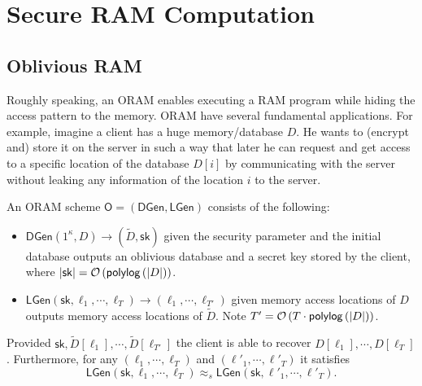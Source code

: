 
\newcommand{\eps}{\varepsilon}
\renewcommand{\inp}[1]{\left(#1\right)}
\newcommand{\inb}[1]{\left[#1\right]}
\newcommand{\inap}[1]{\left\langle #1\right\rangle}
\newcommand{\indi}[1]{\mathbbm{1}\inb{#1}}
\renewcommand{\abs}[1]{\left|#1\right|}
\renewcommand{\prob}[1]{\mathbb{P}\left[#1\right]}
\newcommand{\expec}[1]{\mathbb{E}\left[#1\right]}
\newcommand{\co}[1]{{\mathcal O}\left(#1\right)}
\newcommand{\tco}[1]{{\tilde{\mathcal O}}\left(#1\right)}
\renewcommand{\poly}[1]{{\sf poly}\left(#1\right)}
\newcommand{\polylog}[1]{{\sf polylog}\left(#1\right)}
\newcommand{\negl}[1]{\mathsf{negl}\inp{#1}}

\newcommand{\db}{D}
\newcommand{\odb}{\tilde D}
\renewcommand{\sk}{\mathsf{sk}}
\newcommand{\oram}{\mathsf{O}}
\newcommand{\oramdb}{\mathsf{DGen}}
\newcommand{\oramloc}{\mathsf{LGen}}
\newcommand{\secr}{\kappa}

\newcommand{\statInd}{\approx_s}

\chapter{Secure RAM Computation}

\section{Oblivious RAM}


Roughly speaking, an ORAM enables executing a RAM program while hiding the access pattern to the memory.
ORAM have several fundamental applications. For example, imagine a client has a huge memory/database $\db$. He wants to (encrypt and) store it on the server in such a way that later he can request and get access to a specific location of the database $\db[i]$ by communicating with the server without leaking any information of the location $i$ to the server.

\begin{definition}
An ORAM scheme $\oram = (\oramdb, \oramloc)$ consists of the following:
\begin{itemize}
  \item $\oramdb\inp{1^{\secr}, \db} \rightarrow \inp{\odb, \sk}$  given the security parameter and the initial database outputs an oblivious database and a secret key stored by the client, where $\abs{\sk} = \co{\polylog{\abs{\db}}}$.
  \item $\oramloc\inp{\sk, \ell_1, \cdots, \ell_T} \rightarrow \inp{\ell_1, \cdots, \ell_{T'}}$ given memory access locations of $\db$ outputs memory access locations of $\odb$. Note $T' = \co{T \cdot \polylog{\abs{\db}}}$.
\end{itemize}
Provided $\sk, \odb\inb{\ell_1}, \cdots, \odb\inb{\ell_{T'}}$ the client is able to recover $\db\inb{\ell_1}, \cdots, \db\inb{\ell_T}$.
Furthermore, for any $\inp{\ell_1, \cdots, \ell_T}$ and $\inp{\ell'_1, \cdots, \ell'_T}$ it satisfies
$$\oramloc\inp{\sk, \ell_1, \cdots, \ell_T} \statInd \oramloc\inp{\sk, \ell'_1, \cdots, \ell'_T}.$$
\end{definition}

